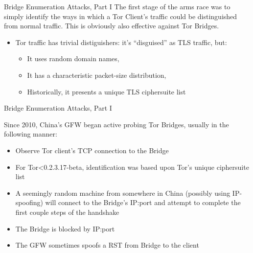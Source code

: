 \documentclass[9pt,a4paper]{beamer}
\begin{document}
\begin{frame}{Bridge Enumeration Attacks, Part I}
  The first stage of the arms race was to simply identify the ways in which a Tor Client's traffic
  could be distinguished from normal traffic.  This is obviously also effective against
  Tor Bridges.

  \begin{itemize}
    \item<2-> Tor traffic has trivial distiguishers: it's ``disguised'' as TLS traffic, but:
      \begin{itemize}
        \item<3-> It uses random domain names,
        \item<4-> It has a characteristic packet-size distribution,
        \item<5-> Historically, it presents a unique TLS ciphersuite list
      \end{itemize}
  \end{itemize}

\end{frame}


\begin{frame}{Bridge Enumeration Attacks, Part I}
  \begin{block}{Since 2010, China's GFW began active probing Tor Bridges, usually in the following manner:}
    \begin{itemize}
    \item<2-> Observe Tor client's TCP connection to the Bridge
    \item<3-> For Tor<0.2.3.17-beta, identification was based upon Tor's unique ciphersuite list
    \item<4-> A seemingly random machine from somewhere in China (possibly using IP-spoofing) will
      connect to the Bridge's IP:port and attempt to complete the first couple steps of the
      handshake
    \item<5-> The Bridge is blocked by IP:port
    \item<6-> The GFW sometimes spoofs a RST from Bridge to the client
    \end{itemize}
  \end{block}

\end{frame}
\end{document}
